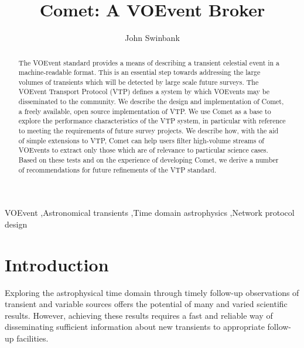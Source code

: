 \documentclass[5p,authoryear]{elsarticle}
\begin{document}
\begin{frontmatter}

\title{Comet: A VOEvent Broker}

\author{John Swinbank}

\address{Anton Pannekoek Institute, University of Amsterdam, Postbus 94249, 1090 GE Amsterdam, The Netherlands}

\begin{abstract}

The VOEvent standard provides a means of describing a transient celestial
event in a machine-readable format. This is an essential step towards
addressing the large volumes of transients which will be detected by large
scale future surveys. The VOEvent Transport Protocol (VTP) defines a system by
which VOEvents may be disseminated to the community. We describe the design
and implementation of Comet, a freely available, open source implementation of
VTP. We use Comet as a base to explore the performance characteristics of the
VTP system, in particular with reference to meeting the requirements of future
survey projects. We describe how, with the aid of simple extensions to VTP,
Comet can help users filter high-volume streams of VOEvents to extract only
those which are of relevance to particular science cases.  Based on these
tests and on the experience of developing Comet, we derive a number of
recommendations for future refinements of the VTP standard.

\end{abstract}

\begin{keyword}
VOEvent \sep Astronomical transients \sep Time domain astrophysics \sep Network protocol design
\end{keyword}

\end{frontmatter}

\section{Introduction}
\label{sec:intro}

Exploring the astrophysical time domain through timely follow-up observations
of transient and variable sources offers the potential of many and varied
scientific results. However, achieving these results requires a fast and
reliable way of disseminating sufficient information about new transients to
appropriate follow-up facilities.
\end{document}
